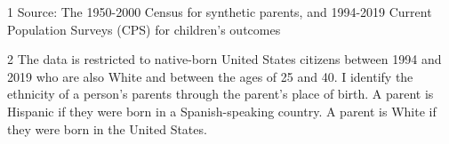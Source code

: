 \begin{table}[H]
{\begin{threeparttable}
\begin{tabular}[t]{lcccccc}
\bottomrule
\end{tabular}
\begin{tablenotes}
\item[1] Source: The 1950-2000 Census for synthetic parents, and 1994-2019 Current Population Surveys (CPS) for children's outcomes
\item[2] The data is restricted to native-born United States citizens between 1994 and 2019 who are also White and between the ages of 25 and 40. I identify the ethnicity of a person's parents through the parent's place of birth. A parent is Hispanic if they were born in a Spanish-speaking country. A parent is White if they were born in the United States.
\end{tablenotes}
\end{threeparttable}}
\end{table}
